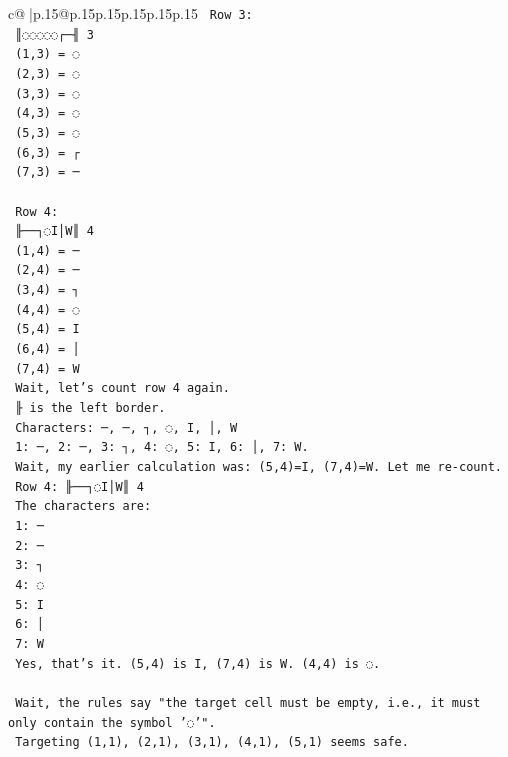 \documentclass{article}
\begin{document}
{\begin{supertabular}{c@{$\;$}|p{.15\linewidth}@{}p{.15\linewidth}p{.15\linewidth}p{.15\linewidth}p{.15\linewidth}p{.15\linewidth}}
{{{\texttt{    Row 3:} \\
\texttt{    ║◌◌◌◌◌┌─╢ 3} \\
\texttt{    (1,3) = ◌} \\
\texttt{    (2,3) = ◌} \\
\texttt{    (3,3) = ◌} \\
\texttt{    (4,3) = ◌} \\
\texttt{    (5,3) = ◌} \\
\texttt{    (6,3) = ┌} \\
\texttt{    (7,3) = ─} \\
\\ 
\texttt{    Row 4:} \\
\texttt{    ╟──┐◌I│W║ 4} \\
\texttt{    (1,4) = ─} \\
\texttt{    (2,4) = ─} \\
\texttt{    (3,4) = ┐} \\
\texttt{    (4,4) = ◌} \\
\texttt{    (5,4) = I} \\
\texttt{    (6,4) = │} \\
\texttt{    (7,4) = W} \\
\texttt{    Wait, let's count row 4 again.} \\
\texttt{    ╟ is the left border.} \\
\texttt{    Characters: ─, ─, ┐, ◌, I, │, W} \\
\texttt{    1: ─, 2: ─, 3: ┐, 4: ◌, 5: I, 6: │, 7: W.} \\
\texttt{    Wait, my earlier calculation was: (5,4)=I, (7,4)=W. Let me re{-}count.} \\
\texttt{    Row 4: ╟──┐◌I│W║ 4} \\
\texttt{    The characters are:} \\
\texttt{    1: ─} \\
\texttt{    2: ─} \\
\texttt{    3: ┐} \\
\texttt{    4: ◌} \\
\texttt{    5: I} \\
\texttt{    6: │} \\
\texttt{    7: W} \\
\texttt{    Yes, that's it. (5,4) is I, (7,4) is W. (4,4) is ◌.} \\
\\ 
\texttt{    Wait, the rules say "the target cell must be empty, i.e., it must only contain the symbol '◌'".} \\
\texttt{    Targeting (1,1), (2,1), (3,1), (4,1), (5,1) seems safe.} \\
}}}
\end{supertabular}}
\end{document}
